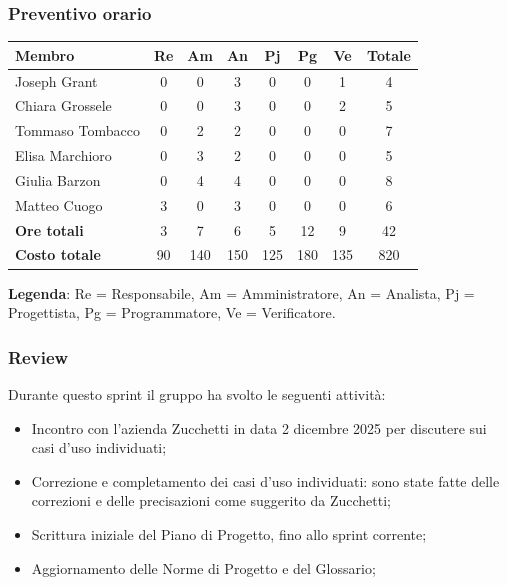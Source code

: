 \documentclass[11pt,a4paper]{article}
\begin{document}
\subsubsection{Preventivo orario}
\begin{center}
    \begin{tabular}{|l|c|c|c|c|c|c|c|}
        \hline
        \textbf{Membro} & \textbf{Re} & \textbf{Am} & \textbf{An} & \textbf{Pj} & \textbf{Pg} & \textbf{Ve} & \textbf{Totale} \\
        \hline
        Joseph Grant & 0 & 0 & 3 & 0 & 0 & 1 & 4 \\
        \hline
        Chiara Grossele & 0 & 0 & 3 & 0 & 0 & 2 & 5 \\
        \hline
        Tommaso Tombacco & 0 & 2 & 2 & 0 & 0 & 0 & 7 \\
        \hline
        Elisa Marchioro & 0 & 3 & 2 & 0 & 0 & 0 & 5 \\
        \hline
        Giulia Barzon & 0 & 4 & 4 & 0 & 0 & 0 & 8 \\
        \hline
        Matteo Cuogo & 3 & 0 & 3 & 0 & 0 & 0 & 6 \\
        \hline
        \textbf{Ore totali} & 3 & 7 & 6 & 5 & 12 & 9 & 42 \\
        \hline
        \textbf{Costo totale} & 90 & 140 & 150 & 125 & 180 & 135 & 820 \\
        \hline
    \end{tabular}
\end{center}

\noindent \textbf{Legenda}: Re = Responsabile, Am = Amministratore, An = Analista, Pj = Progettista, Pg = Programmatore, Ve = Verificatore.

\subsubsection{Review}
Durante questo sprint il gruppo ha svolto le seguenti attività:
 \begin{itemize}
        \item Incontro con l'azienda Zucchetti in data 2 dicembre 2025 per discutere sui casi d'uso individuati;
        \item Correzione e completamento dei casi d'uso individuati: sono state fatte delle correzioni e delle precisazioni come suggerito da Zucchetti;
        \item Scrittura iniziale del Piano di Progetto, fino allo sprint corrente;
        \item Aggiornamento delle Norme di Progetto e del Glossario;
    \end{itemize}
\end{document}
